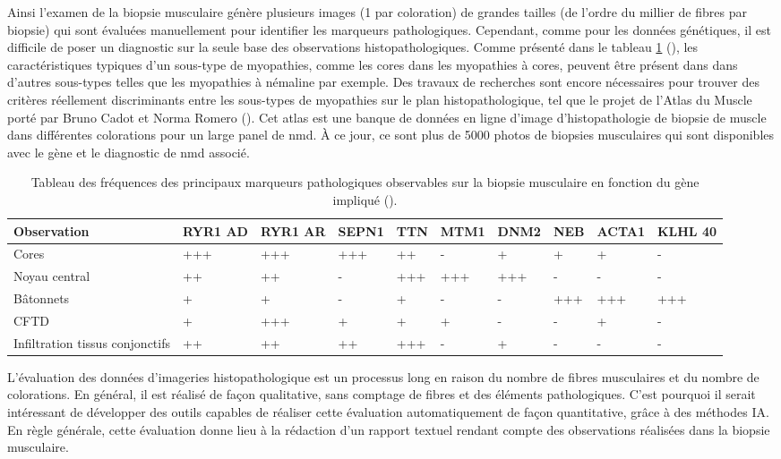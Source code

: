 Ainsi l'examen de la biopsie musculaire génère plusieurs images (1 par coloration) de grandes tailles (de l'ordre du millier de fibres par biopsie) qui sont évaluées manuellement pour identifier les marqueurs pathologiques. Cependant, comme pour les données génétiques, il est difficile de poser un diagnostic sur la seule base des observations histopathologiques. Comme présenté dans le tableau \ref{tab:histopath} (\cite{jungbluth_congenital_2018}), les caractéristiques typiques d'un sous-type de myopathies, comme les cores dans les myopathies à cores, peuvent être présent dans dans d'autres sous-types telles que les myopathies à némaline par exemple. Des travaux de recherches sont encore nécessaires pour trouver des critères réellement discriminants entre les sous-types de myopathies sur le plan histopathologique, tel que le projet de l'Atlas du Muscle porté par Bruno Cadot et Norma Romero (\cite{cadot_atlas_2022}). Cet atlas est une banque de données en ligne d'image d'histopathologie de biopsie de muscle dans différentes colorations pour un large panel de \gls{nmd}. À ce jour, ce sont plus de 5000 photos de biopsies musculaires qui sont disponibles avec le gène et le diagnostic de \gls{nmd} associé. 

\begin{table}[!ht]
\begin{tabularx}{\textwidth}{|p{1.8cm}|X|X|X|X|X|X|X|X|X|}
 \hline
\textbf{Observation} & \textbf{RYR1 AD} & \textbf{RYR1 AR} & \textbf{SEPN1} & \textbf{TTN} & \textbf{MTM1} & \textbf{DNM2} & \textbf{NEB} & \textbf{ACTA1} & \textbf{KLHL 40} \\
\hline
Cores & +++ & +++ & +++ & ++ & - & + & + & + & - \\
\hline
Noyau central & ++ & ++ & - & +++ & +++ & +++ & - & - & - \\
\hline
Bâtonnets  & + & + & - & + & - & - & +++ & +++ & +++ \\
\hline
CFTD & + & +++ & + & + & + & - & - & + & - \\
\hline
Infiltration tissus conjonctifs & ++ & ++ & ++ & +++ & - & + & - & - & - \\
\hline
\end{tabularx}
\caption{Tableau des fréquences des principaux marqueurs pathologiques observables sur la biopsie musculaire en fonction du gène impliqué (\cite{jungbluth_congenital_2018}). }
\label{tab:histopath}
\end{table}
L'évaluation des données d'imageries histopathologique est un processus long en raison du nombre de fibres musculaires et du nombre de colorations. En général, il est réalisé de façon qualitative, sans comptage de fibres et des éléments pathologiques. C'est pourquoi il serait intéressant de développer des outils capables de réaliser cette évaluation automatiquement de façon quantitative, grâce à des méthodes IA. En règle générale, cette évaluation donne lieu à la rédaction d'un rapport textuel rendant compte des observations réalisées dans la biopsie musculaire.

